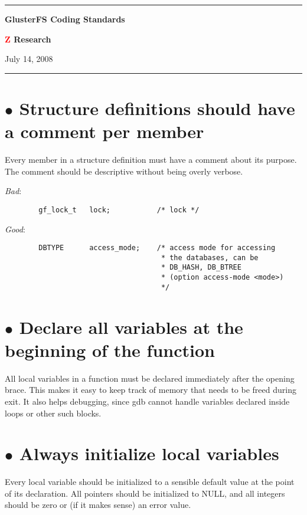 \documentclass{article}[12pt]
\begin{document}
\hrule
\begin{center}\textbf{\Large{GlusterFS Coding Standards}}\end{center}
\begin{center}\textbf{\large{\textcolor{red}{Z} Research}}\end{center}
\begin{center}{July 14, 2008}\end{center}
\hrule

\vspace{8ex}

\section*{$\bullet$ Structure definitions should have a comment per member}

Every member in a structure definition must have a comment about its
purpose. The comment should be descriptive without being overly verbose.

\vspace{2ex}
\textsl{Bad}:

\begin{verbatim}
        gf_lock_t   lock;           /* lock */
\end{verbatim}

\textsl{Good}:

\begin{verbatim}
        DBTYPE      access_mode;    /* access mode for accessing
                                     * the databases, can be
                                     * DB_HASH, DB_BTREE
                                     * (option access-mode <mode>)
                                     */
\end{verbatim}

\section*{$\bullet$ Declare all variables at the beginning of the function}
All local variables in a function must be declared immediately after the
opening brace. This makes it easy to keep track of memory that needs to be freed
during exit. It also helps debugging, since gdb cannot handle variables
declared inside loops or other such blocks.

\section*{$\bullet$ Always initialize local variables}
Every local variable should be initialized to a sensible default value
at the point of its declaration. All pointers should be initialized to NULL,
and all integers should be zero or (if it makes sense) an error value.
\end{document}
